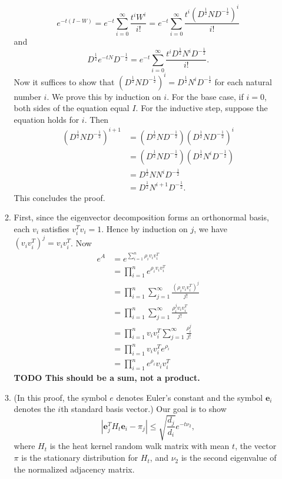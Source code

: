 \documentclass{article}
\newcommand{\todo}[1]{\textbf{TODO #1}}
\newcommand{\1}{\mathbf{1}}
\newcommand{\0}{\mathbf{0}}
\newcommand{\e}{\mathbf{e}}
\begin{document}
\begin{enumerate}
\begin{enumerate}
    \begin{equation*}
      e^{-t(I - W)} = e^{-t} \sum_{i = 0}^\infty \frac{t^i W^i}{i!} = e^{-t} \sum_{i = 0}^\infty \frac{t^i (D^{\frac{1}{2}} N D^{-\frac{1}{2}})^i}{i!}
    \end{equation*}
    and
    \begin{equation*}
      D^{\frac{1}{2}} e^{-tN} D^{-\frac{1}{2}} = e^{-t} \sum_{i = 0}^\infty \frac{t^i D^{\frac{1}{2}} N^i D^{-\frac{1}{2}}}{i!}.
    \end{equation*}
    Now it suffices to show that $(D^{\frac{1}{2}} N D^{-\frac{1}{2}})^i = D^{\frac{1}{2}} N^i D^{-\frac{1}{2}}$ for each natural number $i$.
    We prove this by induction on $i$.
    For the base case, if $i = 0$, both sides of the equation equal $I$.
    For the inductive step, suppose the equation holds for $i$.
    Then
    \begin{align*}
      (D^{\frac{1}{2}} N D^{-\frac{1}{2}})^{i + 1} & = (D^{\frac{1}{2}} N D^{-\frac{1}{2}}) (D^{\frac{1}{2}} N D^{-\frac{1}{2}})^i \\
      & = (D^{\frac{1}{2}} N D^{-\frac{1}{2}}) (D^{\frac{1}{2}} N^i D^{-\frac{1}{2}}) \\
      & = D^{\frac{1}{2}} N N^i D^{-\frac{1}{2}} \\
      & = D^{\frac{1}{2}} N^{i + 1} D^{-\frac{1}{2}}.
    \end{align*}
    This concludes the proof.
  \item
    First, since the eigenvector decomposition forms an orthonormal basis, each $v_i$ satisfies $v_i^T v_i = 1$.
    Hence by induction on $j$, we have $(v_i v_i^T)^j = v_i v_i^T$.
    Now
    \begin{align*}
      e^A & = e^{\sum_{i = 1}^n \rho_i v_i v_i^T} \\
      & = \prod_{i = 1}^n e^{\rho_i v_i v_i^T} \\
      & = \prod_{i = 1}^n \sum_{j = 1}^\infty \frac{(\rho_i v_i v_i^T)^j}{j!} \\
      & = \prod_{i = 1}^n \sum_{j = 1}^\infty \frac{\rho_i^j v_i v_i^T}{j!} \\
      & = \prod_{i = 1}^n v_i v_i^T \sum_{j = 1}^\infty \frac{\rho_i^j}{j!} \\
      & = \prod_{i = 1}^n v_i v_i^T e^{\rho_i} \\
      & = \prod_{i = 1}^n e^{\rho_i} v_i v_i^T
    \end{align*}
    \todo{This should be a sum, not a product.}
  \item
    (In this proof, the symbol $e$ denotes Euler's constant and the symbol $\e_i$ denotes the $i$th standard basis vector.)
    Our goal is to show
    \begin{equation*}
      \left|\e_j^T H_t \e_i - \pi_j\right| \leq \sqrt{\frac{d_j}{d_i}} e^{-t \nu_2},
    \end{equation*}
    where $H_t$ is the heat kernel random walk matrix with mean $t$, the vector $\pi$ is the stationary distribution for $H_t$, and $\nu_2$ is the second eigenvalue of the normalized adjacency matrix.


\end{enumerate}
\end{enumerate}
\end{document}
